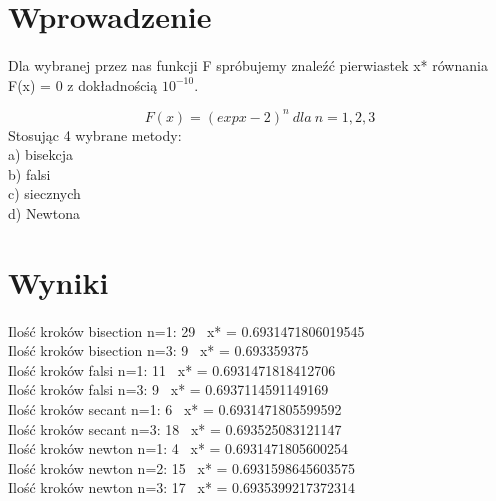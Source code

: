 \documentclass{article}
\begin{document}
\section{Wprowadzenie}

\paragraph{}

Dla wybranej przez nas funkcji F spróbujemy znaleźć pierwiastek x* równania F(x) = 0 z dokładnością
\(10^{-10}\).

\begin{equation} F(x) = (expx - 2)^n \ dla\ n=1,2,3 \end{equation} Stosując 4 wybrane metody:\\
a) bisekcja\\
b) falsi\\
c) siecznych\\
d) Newtona\\

\section{Wyniki}


\paragraph{}

\begingroup\centering
Ilość kroków bisection n=1: 29 \  x* = 0.6931471806019545\\
Ilość kroków bisection n=3: 9 \   x* = 0.693359375\\
Ilość kroków falsi n=1: 11  \     x* = 0.6931471818412706\\
Ilość kroków falsi n=3: 9      \  x* = 0.6937114591149169\\
Ilość kroków secant n=1: 6   \    x* = 0.6931471805599592\\
Ilość kroków secant n=3: 18 \     x* = 0.693525083121147\\
Ilość kroków newton n=1: 4  \     x* = 0.6931471805600254\\
Ilość kroków newton n=2: 15   \   x* = 0.6931598645603575\\
Ilość kroków newton n=3: 17   \   x* = 0.6935399217372314\\

\newpage



\endgroup
\end{document}
